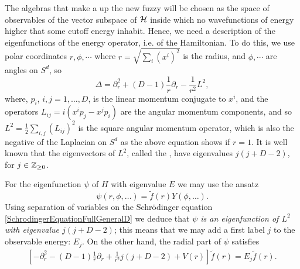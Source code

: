 The algebras that make a up the new fuzzy will be chosen as the space of observables of the vector subspace of $\mathcal H$ inside which no wavefunctions of energy higher that some cutoff energy inhabit. Hence, we need a description of the eigenfunctions of the energy operator, i.e. of the Hamiltonian. 
To do this, we use polar coordinates $r, \phi, \cdots$ where $r = \sqrt{\sum_i (x^i)^2}$ is the radius, and $\phi, \cdots$ are angles on $S^d$, so
\begin{equation}\label{LaplacianPolarCoordinatesGeneralD}
    \Delta = \partial_r^2 + (D-1)\frac{1}{r} \partial_r - \frac{1}{r^2} L^2,
\end{equation}
where, $p_i$, $i, j = 1, \dots, D$, is the linear momentum conjugate to $x^i$, and the operators $L_{ij} = i(x^i p_j - x^j p_i)$ are the angular momentum components, and so $L^2 = \frac{1}{2} \sum_{i, j} (L_{ij})^2$ is the square angular momentum operator, which is also the negative of the Laplacian on $S^d$ as the above equation shows if $r=1$. It is well known \cite{} that the eigenvectors of $L^2$, called the , have eigenvalues $j(j+D-2)$, for $j \in \mathbb{Z}_{\geq 0}$. 

For the eigenfunction $\psi$ of $H$ with eigenvalue $E$ we may use the ansatz
\begin{equation}\label{ansatzSolutionEigenfunctionEigenvalueEnergyHamiltonianGeneralD}
    \psi(r, \phi, \dots) = \tilde f(r) Y(\phi, \dots).
\end{equation}
Using separation of variables on the Schr\"odinger equation \eqref{SchrodingerEquationFullGeneralD} we deduce that \emph{$\psi$ is an eigenfunction of $L^2$ with eigenvalue $j(j+D-2)$}; this means that we may add a first label $j$ to the observable energy: $E_j$. On the other hand, the radial part of $\psi$ satisfies
\begin{align}\label{equationRadialSchrodingerGeneralDPolarAngles}
        \left[-\partial_r^2 - (D-1) \frac{1}{r} \partial_r + \frac{1}{r^2} j(j+D-2) + V(r)\right] \tilde f(r) = E_j \tilde f(r).
\end{align}

